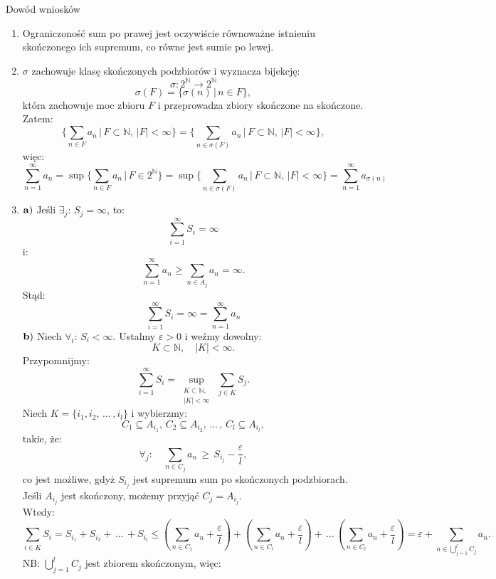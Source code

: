 \documentclass{article}
\newcommand{\N}{\mathbb{N}}
\newcommand{\oo}{\infty}
\begin{document}
    \begin{dow}{Dowód wniosków}
        \begin{enumerate}
            \item Ograniczoność sum po prawej jest oczywiście równoważne istnieniu skończonego ich supremum, co równe jest sumie po lewej.
            \item $\sigma$ zachowuje klasę skończonych podzbiorów i wyznacza bijekcję:
            \[\sigma: 2^{\N} \rightarrow 2^{\N}\]
            \[\sigma(F) = \{ \sigma(n)\,|\, n \in F \},\]
            która zachowuje moc zbioru $F$ i przeprowadza zbiory skończone na skończone. Zatem:
            \[\biggl\{ \sum_{n \in F} a_n \, \bigg| \, F \subset \N, \, |F| < \oo\biggr\} = \biggl\{ \sum_{n \in \sigma(F)} a_{n} \, \bigg| \, F \subset \N, \, |F| < \oo\biggr\}, \]
            więc:
            \[ \sum_{n=1}^{\oo} a_n = \sup{\biggl\{ \sum_{n \in F} a_n \, \bigg| \, F \in 2^{\N}\biggr\}}  = \sup{\biggl\{ \sum_{n \in \sigma(F)} a_{n} \, \bigg| \, F \subset \N, \, |F| < \oo\biggr\}} = \sum_{n=1}^{\oo} a_{\sigma(n)}\]
            \item 
            $\bold{a)}$ Jeśli $\exists_j: \, S_j = \oo$, to:
            \[\sum_{i=1}^{\oo} S_i = \oo\]
            i:
            \[\sum_{n=1}^{\oo} a_n \geqslant \sum_{n \in A_j} a_n = \oo.\]
            Stąd:
            \[\sum_{i=1}^{\oo} S_i = \oo = \sum_{n=1}^{\oo} a_n\]
            $\bold{b)}$ Niech $\forall_{i}: \, S_i < \oo$. Ustalmy $\varepsilon > 0$ i weźmy dowolny: 
            \[K \subset \N, \quad |K| < \oo.\]
            Przypomnijmy:
            \[\sum_{i=1}^{\oo}S_i = \sup_{\substack{K \subset \N, \\ |K| < \oo}} \, \sum_{j \in K} S_j.\]
            Niech $K = \{ i_1, i_2,\, ...\,, i_l \}$ i wybierzmy:
            \[C_1 \subseteq A_{i_1}, \, C_2 \subseteq A_{i_2}, \, ...\, , \, C_l \subseteq A_{i_l}, \]
            takie, że:
            \[\forall_j: \quad \sum_{n \in C_j} a_n \,  \geqslant \, S_{i_j} - \frac{\varepsilon}{l},\]
            co jest możliwe, gdyż $S_{i_j}$ jest supremum sum po skończonych podzbiorach. Jeśli $A_{i_j}$ jest skończony, możemy przyjąć $C_j = A_{i_j}$. \\
            Wtedy:
            \[\sum_{i \in K} S_i = S_{i_1} + S_{i_2} + \, ... \, + S_{i_l} \leqslant \left( \sum_{n\in C_1} a_n + \frac{\varepsilon}{l} \right) + \left( \sum_{n\in C_l} a_n + \frac{\varepsilon}{l} \right) + \, ... \, \left( \sum_{n\in C_l} a_n + \frac{\varepsilon}{l} \right) = \varepsilon + \sum_{n \in \bigcup_{j=1}^l C_j} a_n.\]
            NB: $\bigcup_{j=1}^l C_j$ jest zbiorem skończonym, więc:

\end{enumerate}
\end{dow}
\end{document}
